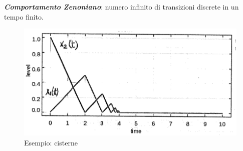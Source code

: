 \documentclass[a4paper, notitlepage, 10pt]{report}
\begin{document}
\noindent
\textit{\textbf{Comportamento Zenoniano}}: numero infinito di transizioni discrete in un tempo finito.
\begin{figure}[H]
	\centering
	\includegraphics[scale=0.35]{Cisterne}
	\caption*{Esempio: cisterne}
\end{figure}
\end{document}
